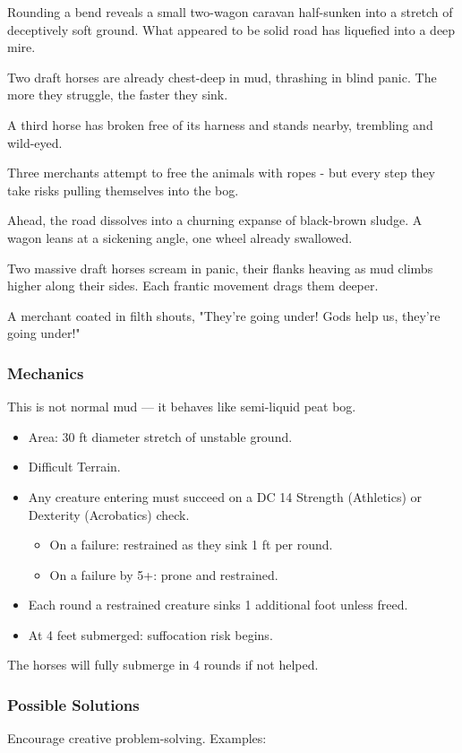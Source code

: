 Rounding a bend reveals a small two-wagon caravan half-sunken into a stretch of deceptively soft ground. What appeared to be solid road has liquefied into a deep mire.

Two draft horses are already chest-deep in mud, thrashing in blind panic. The more they struggle, the faster they sink.

A third horse has broken free of its harness and stands nearby, trembling and wild-eyed.

Three merchants attempt to free the animals with ropes - but every step they take risks pulling themselves into the bog.
\begin{DndReadAloud}
	Ahead, the road dissolves into a churning expanse of black-brown sludge. A wagon leans at a sickening angle, one wheel already swallowed.

	Two massive draft horses scream in panic, their flanks heaving as mud climbs higher along their sides. Each frantic movement drags them deeper.

	A merchant coated in filth shouts, "They're going under! Gods help us, they're going under!"
\end{DndReadAloud}

\subsubsection*{Mechanics}
{\entryfont This is not normal mud — it behaves like semi-liquid peat bog.
\begin{itemize}
	\item Area: 30 ft diameter stretch of unstable ground.
	\item Difficult Terrain.
	\item Any creature entering must succeed on a DC 14 Strength (Athletics) or Dexterity (Acrobatics) check.
	\begin{itemize}
		\item On a failure: restrained as they sink 1 ft per round.
		\item On a failure by 5+: prone and restrained.
	\end{itemize}
	\item Each round a restrained creature sinks 1 additional foot unless freed.
	\item At 4 feet submerged: suffocation risk begins.
\end{itemize}
The horses will fully submerge in 4 rounds if not helped.}

\subsubsection*{Possible Solutions}
Encourage creative problem-solving. Examples:
